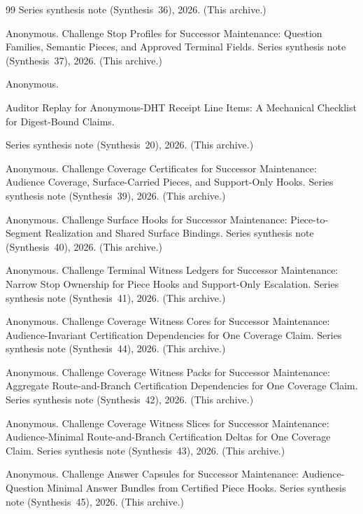 \documentclass[11pt]{article}
\begin{document}
\begin{thebibliography}{99}
\newblock Series synthesis note (Synthesis~36), 2026. (This archive.)

Anonymous.
\newblock Challenge Stop Profiles for Successor Maintenance: Question Families, Semantic Pieces, and Approved Terminal Fields.
\newblock Series synthesis note (Synthesis~37), 2026. (This archive.)

Anonymous.

\newblock Auditor Replay for Anonymous-DHT Receipt Line Items: A Mechanical Checklist for Digest-Bound Claims.

\newblock Series synthesis note (Synthesis~20), 2026. (This archive.)


Anonymous.
\newblock Challenge Coverage Certificates for Successor Maintenance: Audience Coverage, Surface-Carried Pieces, and Support-Only Hooks.
\newblock Series synthesis note (Synthesis~39), 2026. (This archive.)

Anonymous.
\newblock Challenge Surface Hooks for Successor Maintenance: Piece-to-Segment Realization and Shared Surface Bindings.
\newblock Series synthesis note (Synthesis~40), 2026. (This archive.)

Anonymous.
\newblock Challenge Terminal Witness Ledgers for Successor Maintenance: Narrow Stop Ownership for Piece Hooks and Support-Only Escalation.
\newblock Series synthesis note (Synthesis~41), 2026. (This archive.)

Anonymous.
\newblock Challenge Coverage Witness Cores for Successor Maintenance: Audience-Invariant Certification Dependencies for One Coverage Claim.
\newblock Series synthesis note (Synthesis~44), 2026. (This archive.)

Anonymous.
\newblock Challenge Coverage Witness Packs for Successor Maintenance: Aggregate Route-and-Branch Certification Dependencies for One Coverage Claim.
\newblock Series synthesis note (Synthesis~42), 2026. (This archive.)

Anonymous.
\newblock Challenge Coverage Witness Slices for Successor Maintenance: Audience-Minimal Route-and-Branch Certification Deltas for One Coverage Claim.
\newblock Series synthesis note (Synthesis~43), 2026. (This archive.)

Anonymous.
\newblock Challenge Answer Capsules for Successor Maintenance: Audience-Question Minimal Answer Bundles from Certified Piece Hooks.
\newblock Series synthesis note (Synthesis~45), 2026. (This archive.)


\end{thebibliography}
\end{document}
